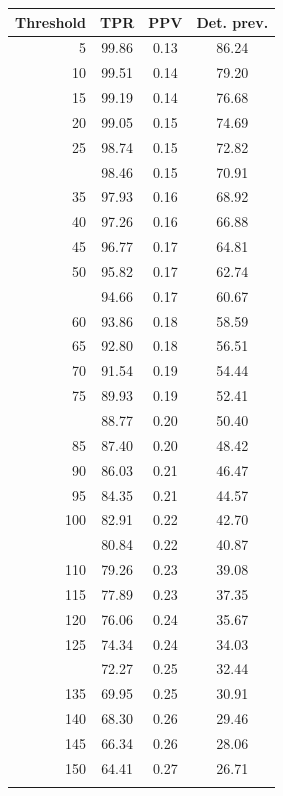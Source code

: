 \documentclass[12pt]{article}
\begin{document}
\begin{minipage}{0.5\textwidth}\small
\begin{tabular}{rccc}
\toprule
\textbf{Threshold} & \textbf{TPR} 
& \textbf{PPV} & \textbf{Det. prev.} \\
\midrule

    5 & 99.86 & 0.13 & 86.24 \\ 
     10 & 99.51 & 0.14 & 79.20 \\ 
     15 & 99.19 & 0.14 & 76.68 \\ 
     20 & 99.05 & 0.15 & 74.69 \\ 
     25 & 98.74 & 0.15 & 72.82 \\ \addlinespace
     30 & 98.46 & 0.15 & 70.91 \\ 
     35 & 97.93 & 0.16 & 68.92 \\ 
     40 & 97.26 & 0.16 & 66.88 \\ 
     45 & 96.77 & 0.17 & 64.81 \\ 
     50 & 95.82 & 0.17 & 62.74 \\  \addlinespace
     55 & 94.66 & 0.17 & 60.67 \\ 
     60 & 93.86 & 0.18 & 58.59 \\ 
     65 & 92.80 & 0.18 & 56.51 \\ 
     70 & 91.54 & 0.19 & 54.44 \\ 
     75 & 89.93 & 0.19 & 52.41 \\  \addlinespace
     80 & 88.77 & 0.20 & 50.40 \\ 
     85 & 87.40 & 0.20 & 48.42 \\ 
     90 & 86.03 & 0.21 & 46.47 \\ 
     95 & 84.35 & 0.21 & 44.57 \\ 
    100 & 82.91 & 0.22 & 42.70 \\  \addlinespace
    105 & 80.84 & 0.22 & 40.87 \\ 
    110 & 79.26 & 0.23 & 39.08 \\ 
    115 & 77.89 & 0.23 & 37.35 \\ 
    120 & 76.06 & 0.24 & 35.67 \\ 
    125 & 74.34 & 0.24 & 34.03 \\  \addlinespace
    130 & 72.27 & 0.25 & 32.44 \\ 
    135 & 69.95 & 0.25 & 30.91 \\ 
    140 & 68.30 & 0.26 & 29.46 \\ 
    145 & 66.34 & 0.26 & 28.06 \\ 
    150 & 64.41 & 0.27 & 26.71 \\  \addlinespace

\end{tabular}
\end{minipage}
\end{document}
